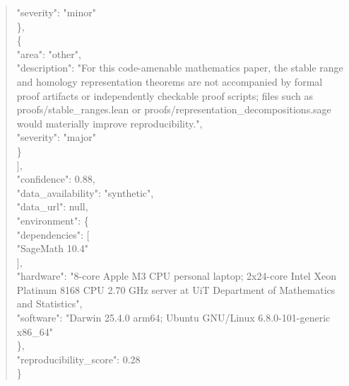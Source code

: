 \documentclass[11pt]{article}
\begin{document}
\begin{quote}
      "severity": "minor"\\
    \},\\
    \{\\
      "area": "other",\\
      "description": "For this code-amenable mathematics paper, the stable range and homology representation theorems are not accompanied by formal proof artifacts or independently checkable proof scripts; files such as proofs/stable\_ranges.lean or proofs/representation\_decompositions.sage would materially improve reproducibility.",\\
      "severity": "major"\\
    \}\\
  ],\\
  "confidence": 0.88,\\
  "data\_availability": "synthetic",\\
  "data\_url": null,\\
  "environment": \{\\
    "dependencies": [\\
      "SageMath 10.4"\\
    ],\\
    "hardware": "8-core Apple M3 CPU personal laptop; 2x24-core Intel Xeon Platinum 8168 CPU 2.70 GHz server at UiT Department of Mathematics and Statistics",\\
    "software": "Darwin 25.4.0 arm64; Ubuntu GNU/Linux 6.8.0-101-generic x86\_64"\\
  \},\\
  "reproducibility\_score": 0.28\\
\}\\
\end{quote}
\end{document}
